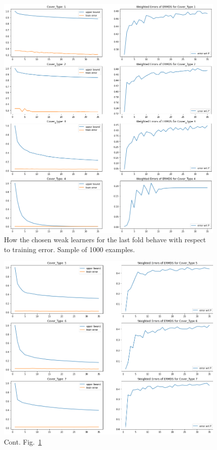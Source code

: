 \documentclass{scrartcl}
\begin{document}
\begin{figure}
  \includegraphics[width=1\textwidth]{imgs/N1000_T35/upper_bound_1000_pt1.png}
  \centering
  \caption{How the chosen weak learners for the last fold behave with respect to training error. Sample of 1000 examples.}
  \label{figure:tab1_ub_1000}
\end{figure}
\begin{figure}
  \includegraphics[width=1\textwidth]{imgs/N1000_T35/upper_bound_1000_pt2.png}
  \centering
  \caption{Cont. Fig.~\ref{figure:tab1_ub_1000}}
  \label{figure:tab2_ub_1000}
\end{figure}
\end{document}
